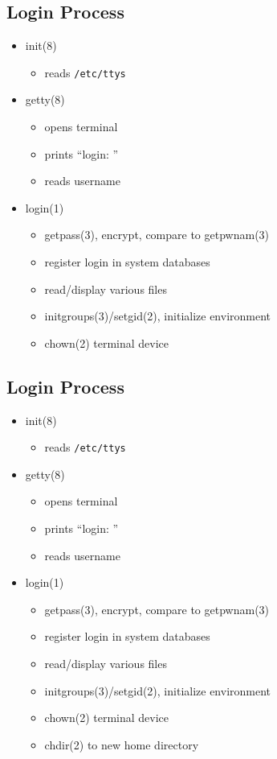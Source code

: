 \documentclass[xga]{xdvislides}
\begin{document}
\subsection{Login Process}
\begin{itemize}
	\item init(8)
		\begin{itemize}
			\item reads {\tt /etc/ttys}
		\end{itemize}
	\item getty(8)
		\begin{itemize}
			\item opens terminal
			\item prints ``login: ''
			\item reads username
		\end{itemize}
	\item login(1)
		\begin{itemize}
			\item getpass(3), encrypt, compare to getpwnam(3)
			\item register login in system databases
			\item read/display various files
			\item initgroups(3)/setgid(2), initialize environment
			\item chown(2) terminal device
		\end{itemize}
\end{itemize}

\subsection{Login Process}
\begin{itemize}
	\item init(8)
		\begin{itemize}
			\item reads {\tt /etc/ttys}
		\end{itemize}
	\item getty(8)
		\begin{itemize}
			\item opens terminal
			\item prints ``login: ''
			\item reads username
		\end{itemize}
	\item login(1)
		\begin{itemize}
			\item getpass(3), encrypt, compare to getpwnam(3)
			\item register login in system databases
			\item read/display various files
			\item initgroups(3)/setgid(2), initialize environment
			\item chown(2) terminal device
			\item chdir(2) to new home directory
		\end{itemize}
\end{itemize}
\end{document}
